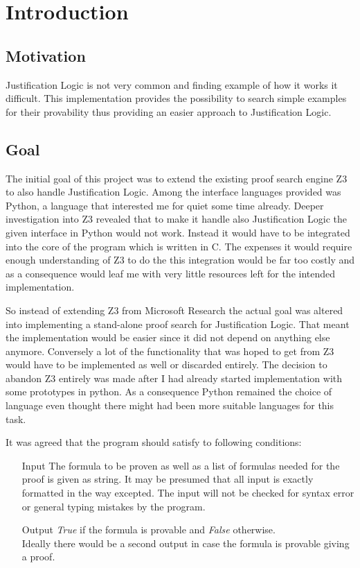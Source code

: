\chapter{Introduction}

\section{Motivation}
Justification Logic is not very common and finding example of how it works it difficult. This implementation provides the possibility to search simple examples for their provability thus providing an easier approach to Justification Logic.

\section{Goal}
The initial goal of this project was to extend the existing proof search engine Z3~\cite{z3} to also handle Justification Logic. Among the interface languages provided was Python, a language that interested me for quiet some time already. Deeper investigation into Z3 revealed that to make it handle also Justification Logic the given interface in Python would not work. Instead it would have to be integrated into the core of the program which is written in C. The expenses it would require enough understanding of Z3 to do the this integration would be far too costly and as a consequence would leaf me with very little resources left for the intended implementation.

So instead of extending Z3 from Microsoft Research the actual goal was altered into implementing a stand-alone proof search for Justification Logic. That meant the implementation would be easier since it did not depend on anything else anymore. Conversely a lot of the functionality that was hoped to get from Z3 would have to be implemented as well or discarded entirely. The decision to abandon Z3 entirely was made after I had already started implementation with some prototypes in python. As a consequence Python remained the choice of language even thought there might had been more suitable languages for this task.

It was agreed that the program should satisfy to following conditions:

\begin{itemize}
	\item[Input] The formula to be proven as well as a list of formulas needed for the proof is given as string. It may be presumed that all input is exactly formatted in the way excepted. The input will not be checked for syntax error or general typing mistakes by the program.
	\item[Output] \emph{True} if the formula is provable and \emph{False} otherwise. \\Ideally there would be a second output in case the formula is provable giving a proof.
\end{itemize}

